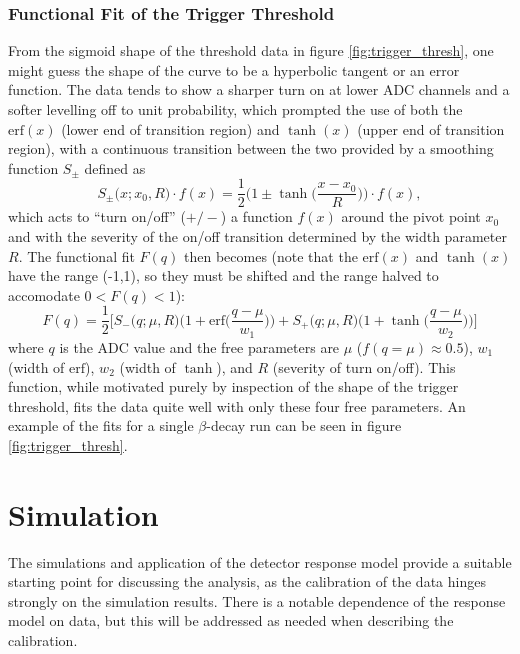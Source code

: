 \subsubsection{Functional Fit of the Trigger Threshold}
From the sigmoid shape of the threshold data in figure \ref{fig:trigger_thresh}, one might guess
the shape of the curve to be a hyperbolic tangent or an error function. The data tends to show
a sharper turn on at lower ADC channels and a softer levelling off to unit probability, which
prompted the use of both the $\mathrm{erf}(x)$ (lower end of transition region)
and $\tanh(x)$ (upper end of transition region),
with a continuous transition between the
two provided by a smoothing function $S_\pm$ defined as
%
\begin{equation}
  S_\pm\big(x;x_0,R\big) \cdot f(x) = \frac{1}{2}\bigg(1\pm\tanh\Big(\frac{x-x_0}{R}\Big)\bigg) \cdot f(x),
\end{equation}
%
which acts to ``turn on/off'' ($+/-$) a function $f(x)$ around the pivot point $x_0$ and with the severity of
the on/off transition determined by the width parameter $R$. The functional fit $F(q)$ then becomes (note that the $\mathrm{erf}(x)$ and $\tanh(x)$ 
have the range (-1,1), so they must be shifted and the range halved to accomodate $0<F(q)<1$):
%
\begin{equation}
  F(q) = \frac{1}{2} \Bigg[ S_-\big(q;\mu,R\big) \bigg(1 + \mathrm{erf}\Big(\frac{q-\mu}{w_1}\Big)\bigg) +
  S_+\big(q;\mu,R\big) \bigg(1+\tanh\Big(\frac{q-\mu}{w_2}\Big)\bigg)\Bigg]
\end{equation}
%
where $q$ is the ADC value and
the free parameters are $\mu$ ($f(q=\mu)\approx 0.5$), $w_1$ (width of $\mathrm{erf}$), $w_2$ (width of $\tanh$), and $R$ (severity of turn on/off).
This function, while motivated purely by inspection of the shape of the trigger threshold, fits the data
quite well with only these four free parameters. An example of the fits for a single $\beta$-decay
run can be seen in figure \ref{fig:trigger_thresh}. 



\section{Simulation}
\label{sec:Simulation}

The simulations and application of the
detector response model provide a suitable starting
point for discussing the analysis, as the calibration of the data hinges
strongly on the simulation results. There is a notable dependence of the
response model on data, but this will be addressed as needed
when describing the calibration.

